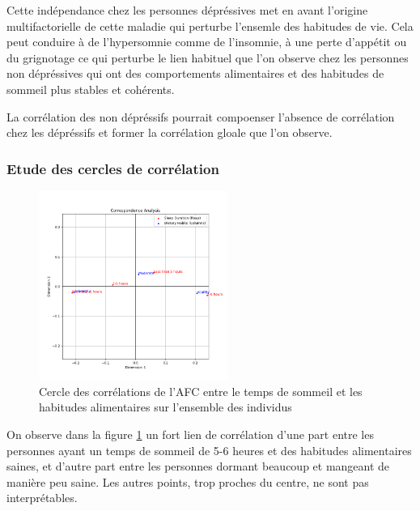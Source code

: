 Cette indépendance chez les personnes dépréssives met en avant l'origine multifactorielle de cette maladie qui perturbe l'ensemle des habitudes de vie. Cela peut conduire à de l'hypersomnie comme de l'insomnie, à une perte d'appétit ou du grignotage ce qui perturbe le lien habituel que l'on observe chez les personnes non dépréssives qui ont des comportements alimentaires et des habitudes de sommeil plus stables et cohérents. 

La corrélation des non dépréssifs pourrait compoenser l'absence de corrélation chez les dépréssifs et former la corrélation gloale que l'on observe. 

\subsubsection{Etude des cercles de corrélation}

\begin{figure}[!h]
  \begin{center}
    \includegraphics[width=0.55\textwidth]{Images/Sleep_Dietary_all/Corr_circle.png}
  \end{center}
  \caption{Cercle des corrélations de l'AFC entre le temps de sommeil et les habitudes alimentaires sur l'ensemble des individus}\label{fig:corrSleepDietaryAll}
\end{figure}

On observe dans la figure \ref{fig:corrSleepDietaryAll} un fort lien de corrélation d'une part entre les personnes ayant un temps de sommeil de 5-6 heures et des habitudes alimentaires saines, et d'autre part entre les personnes dormant beaucoup et mangeant de manière peu saine. Les autres points, trop proches du centre, ne sont pas interprétables. 

